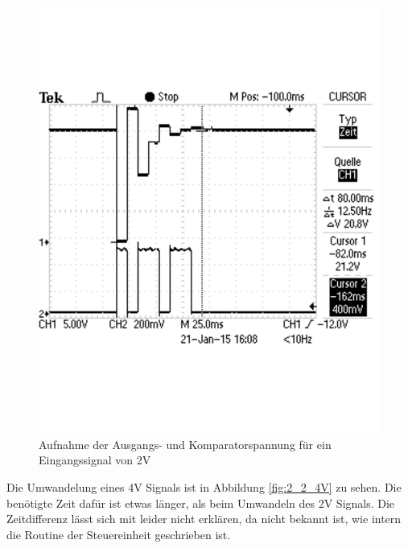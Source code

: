 \documentclass[12pt,a4paper]{article}
\begin{document}
\begin{figure}[H]
  \centering 	
    \includegraphics[trim = 0mm 50mm 0mm 50mm, clip, scale = 0.4]{2_2_2V.pdf}
  	\caption[Aufnahme der Ausgangs- und Komparatorspannung für ein Eingangssignal von 2V]{Aufnahme der Ausgangs- und Komparatorspannung für ein Eingangssignal von 2V} 
  \label{fig:2_2_2V}
\end{figure}

Die Umwandelung eines 4V Signals ist in Abbildung \ref{fig:2_2_4V} zu sehen. Die benötigte Zeit dafür ist etwas länger, als beim Umwandeln des 2V Signals. Die Zeitdifferenz lässt sich mit leider nicht erklären, da nicht bekannt ist, wie intern die Routine der Steuereinheit geschrieben ist.
\end{document}
